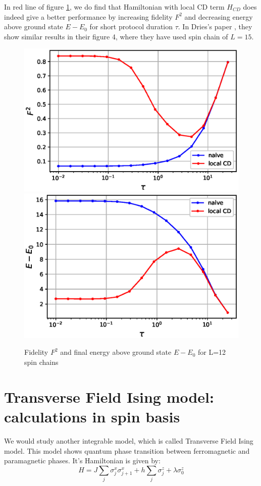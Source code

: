 \documentclass[11pt,a4paper]{article}
\begin{document}
In red line of figure \ref{fid_energ}, we do find that Hamiltonian with local CD term $H_{CD}$ does indeed give a better performance by increasing fidelity $F^2$ and decreasing energy above ground state $E-E_0$ for short protocol duration $\tau$. 
In Dries's paper \cite{sels2017minimizing}, they show  similar results in their figure 4, where they have used spin chain of $L=15$.



\begin{figure}
\centering
\includegraphics[scale=0.5]{fidelity_naive.eps}
\includegraphics[scale=0.5]{final_energy_naive.eps}
\caption{Fidelity $F^2$ and final energy above ground state $E- E_0$ for L=12 spin chains}
\label{fid_energ}
\end{figure}


\section{Transverse Field Ising model: calculations in spin basis}
We would study another integrable model, which is called Transverse Field Ising model. This model shows quantum phase transition between ferromagnetic and paramagnetic phases. It's Hamiltonian is given by:
\begin{equation}
H= J \sum_{j} \sigma_j^x \sigma_{j+1}^x + h \sum_{j} \sigma_j^z + \lambda  \sigma_{0}^z
\label{xx_z_2}
\end{equation}
\end{document}
